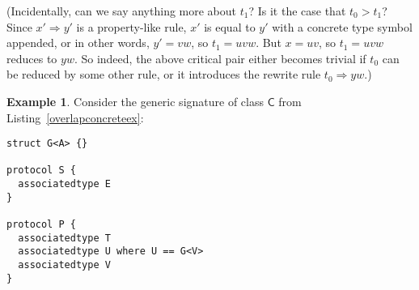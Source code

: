 \documentclass[headsepline,bibliography=totoc]{scrreport}
\newcommand{\namesym}[1]{\mathsf{#1}}
\theoremstyle{definition}
\newtheorem{example}{Example}[chapter]
\theoremstyle{definition}
\theoremstyle{definition}
\begin{document}
(Incidentally, can we say anything more about $t_1$? Is it the case that $t_0>t_1$? Since $x'\Rightarrow y'$ is a property-like rule, $x'$ is equal to $y'$ with a concrete type symbol appended, or in other words, $y'=vw$, so $t_1=uvw$. But $x=uv$, so $t_1=uvw$ reduces to $yw$. So indeed, the above critical pair either becomes trivial if $t_0$ can be reduced by some other rule, or it introduces the rewrite rule $t_0\Rightarrow yw$.)

\begin{example}
Consider the generic signature of class $\namesym{C}$ from Listing~\ref{overlapconcreteex}:
\begin{listing}\caption{Example with overlap involving concrete type term}\label{overlapconcreteex}
\begin{Verbatim}
struct G<A> {}

protocol S {
  associatedtype E
}

protocol P {
  associatedtype T
  associatedtype U where U == G<V>
  associatedtype V
}


\end{Verbatim}
\end{listing}
\end{example}
\end{document}
